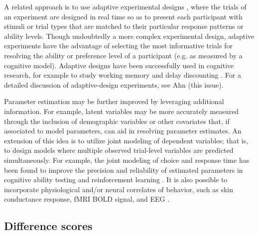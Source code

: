 \documentclass[a4paper,notitlepage,12pt]{article}
\begin{document}
A related approach is to use adaptive experimental designs \cite{myung2013tutorial}, where the trials of an experiment are designed in real time so as to present each participant with stimuli or trial types that are matched to their particular response patterns or ability levels. Though undoubtedly a more complex experimental design, adaptive experiments have the advantage of selecting the most informative trials for resolving the ability or preference level of a participant (e.g. as measured by a cognitive model). Adaptive designs have been successfully used in cognitive research, for example to study working memory \cite{gonthier2018measuring} and delay discounting \cite{ahn2020rapid}. For a detailed discussion of adaptive-design experiments, see Ahn (this issue). 

Parameter estimation may be further improved by leveraging additional information. For example, latent variables may be more accurately measured through the inclusion of demographic variables or other covariates \cite{Curran2016-bt} that, if associated to model parameters, can aid in resolving parameter estimates. An extension of this idea is to utilize joint modeling of dependent variables; that is, to design models where multiple observed trial-level variables are predicted simultaneously. For example, the joint modeling of choice and response time has been found to improve the precision and reliability of estimated parameters in cognitive ability testing \cite{bertling2018using} and reinforcement learning \cite{ballard2019joint, shahar2019improving}. It is also possible to incorporate physiological and/or neural correlates of behavior, such as skin conductance response, fMRI BOLD signal, and EEG \cite{palestro2018tutorial}. 

\subsection{Difference scores}
\end{document}
